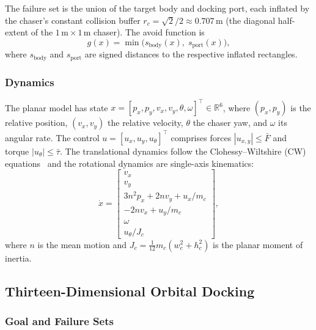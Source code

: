 \documentclass[letterpaper, 10 pt, conference]{ieeeconf}
\begin{document}
The failure set is the union of the target body and docking port, each inflated by the chaser's constant collision buffer $r_c = \sqrt{2}/2 \approx 0.707$\,m (the diagonal half-extent of the $1\,\mathrm{m} \times 1\,\mathrm{m}$ chaser). The avoid function is
\begin{equation}\label{eq:avoid_fn}
g(x) = \min\!\big(s_{\mathrm{body}}(x),\; s_{\mathrm{port}}(x)\big),
\end{equation}
where $s_{\mathrm{body}}$ and $s_{\mathrm{port}}$ are signed distances to the respective inflated rectangles.

\subsubsection{Dynamics}

The planar model has state $x = [p_x, p_y, v_x, v_y, \theta, \omega]^\top \in \mathbb{R}^6$, where $(p_x, p_y)$ is the relative position, $(v_x, v_y)$ the relative velocity, $\theta$ the chaser yaw, and $\omega$ its angular rate. The control $u = [u_x, u_y, u_\theta]^\top$ comprises forces $|u_{x,y}| \leq \bar{F}$ and torque $|u_\theta| \leq \bar{\tau}$. The translational dynamics follow the Clohessy--Wiltshire (CW) equations~\cite{clohessy1960} and the rotational dynamics are single-axis kinematics:
\begin{equation}\label{eq:cw6d}
\dot{x} = \begin{bmatrix} v_x \\ v_y \\ 3n^2 p_x + 2nv_y + u_x/m_c \\ -2nv_x + u_y/m_c \\ \omega \\ u_\theta / J_c \end{bmatrix},
\end{equation}
where $n$ is the mean motion and $J_c = \tfrac{1}{12}m_c(w_c^2 + h_c^2)$ is the planar moment of inertia.

\subsection{Thirteen-Dimensional Orbital Docking}

\subsubsection{Goal and Failure Sets}
\end{document}
